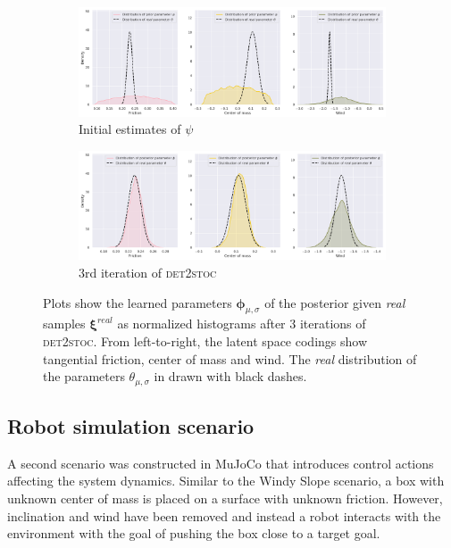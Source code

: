 \documentclass{kththesis}
\newcommand{\vph}{\boldsymbol{\phi}}
\newcommand{\vpsi}{\vec{\psi}}
\renewcommand{\vec}[1]{\boldsymbol{#1}}
\newcommand{\dettostoc}{\textsc{det2stoc}}
\begin{document}
\begin{figure}
\centering
\captionsetup{size=footnotesize}
\begin{subfigure}{\linewidth}
  \includegraphics[width=1.0\linewidth]{img/windyslope/latent-representation/new/iter0}
  \caption{Initial estimates of $\psi$}
  \label{fig_3_parameters_0}
\end{subfigure}
\begin{subfigure}{\textwidth}
  \includegraphics[width=1.0\linewidth]{img/windyslope/latent-representation/new/latent_encoding_iter3}
  \caption{3rd iteration of \dettostoc{}}
\end{subfigure}
\caption{Plots show the learned parameters $\vph_{\mu, \sigma}$ of the posterior given \emph{real} samples $\vec{\xi}^{real}$ as normalized histograms after 3 iterations of \dettostoc{}.
From left-to-right, the latent space codings show tangential friction, center of mass and wind. %
The \emph{real} distribution of the parameters $\theta_{\mu, \sigma}$ in drawn with black dashes.}
\label{fig:windyslope_latent_space}
\end{figure}

\subsection{Robot simulation scenario}

A second scenario was constructed in MuJoCo that introduces control actions affecting the system dynamics. Similar to the Windy Slope scenario, a box with unknown center of mass is placed on a surface with unknown friction. However, inclination and wind have been removed and instead a robot interacts with the environment with the goal of pushing the box close to a target goal.
\end{document}
